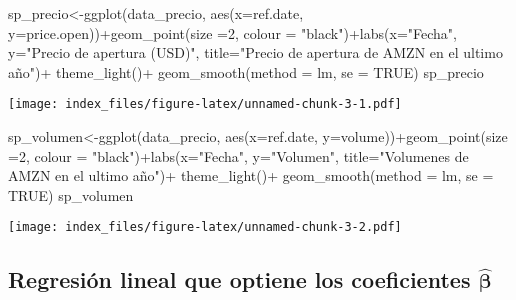 \documentclass[
]{book}
\newenvironment{Shaded}{\begin{snugshade}}{\end{snugshade}}
\newcommand{\AttributeTok}[1]{\textcolor[rgb]{0.77,0.63,0.00}{#1}}
\newcommand{\ConstantTok}[1]{\textcolor[rgb]{0.00,0.00,0.00}{#1}}
\newcommand{\DecValTok}[1]{\textcolor[rgb]{0.00,0.00,0.81}{#1}}
\newcommand{\FunctionTok}[1]{\textcolor[rgb]{0.00,0.00,0.00}{#1}}
\newcommand{\NormalTok}[1]{#1}
\newcommand{\OtherTok}[1]{\textcolor[rgb]{0.56,0.35,0.01}{#1}}
\newcommand{\SpecialCharTok}[1]{\textcolor[rgb]{0.00,0.00,0.00}{#1}}
\newcommand{\StringTok}[1]{\textcolor[rgb]{0.31,0.60,0.02}{#1}}
\begin{document}
\begin{Shaded}
\begin{Highlighting}[]
\NormalTok{sp\_precio}\OtherTok{\textless{}{-}}\FunctionTok{ggplot}\NormalTok{(data\_precio, }\FunctionTok{aes}\NormalTok{(}\AttributeTok{x=}\NormalTok{ref.date, }\AttributeTok{y=}\NormalTok{price.open))}\SpecialCharTok{+}\FunctionTok{geom\_point}\NormalTok{(}\AttributeTok{size =}\DecValTok{2}\NormalTok{, }\AttributeTok{colour =} \StringTok{"black"}\NormalTok{)}\SpecialCharTok{+}\FunctionTok{labs}\NormalTok{(}\AttributeTok{x=}\StringTok{"Fecha"}\NormalTok{, }\AttributeTok{y=}\StringTok{"Precio de apertura (USD)"}\NormalTok{, }\AttributeTok{title=}\StringTok{"Precio de apertura de AMZN en el ultimo año"}\NormalTok{)}\SpecialCharTok{+} \FunctionTok{theme\_light}\NormalTok{()}\SpecialCharTok{+} \FunctionTok{geom\_smooth}\NormalTok{(}\AttributeTok{method =}\NormalTok{ lm, }\AttributeTok{se =} \ConstantTok{TRUE}\NormalTok{)}
\NormalTok{sp\_precio}
\end{Highlighting}
\end{Shaded}

\texttt{[image: index\_files/figure-latex/unnamed-chunk-3-1.pdf]}

\begin{Shaded}
\begin{Highlighting}[]

\NormalTok{sp\_volumen}\OtherTok{\textless{}{-}}\FunctionTok{ggplot}\NormalTok{(data\_precio, }\FunctionTok{aes}\NormalTok{(}\AttributeTok{x=}\NormalTok{ref.date, }\AttributeTok{y=}\NormalTok{volume))}\SpecialCharTok{+}\FunctionTok{geom\_point}\NormalTok{(}\AttributeTok{size =}\DecValTok{2}\NormalTok{, }\AttributeTok{colour =} \StringTok{"black"}\NormalTok{)}\SpecialCharTok{+}\FunctionTok{labs}\NormalTok{(}\AttributeTok{x=}\StringTok{"Fecha"}\NormalTok{, }\AttributeTok{y=}\StringTok{"Volumen"}\NormalTok{, }\AttributeTok{title=}\StringTok{"Volumenes de AMZN en el ultimo año"}\NormalTok{)}\SpecialCharTok{+} \FunctionTok{theme\_light}\NormalTok{()}\SpecialCharTok{+} \FunctionTok{geom\_smooth}\NormalTok{(}\AttributeTok{method =}\NormalTok{ lm, }\AttributeTok{se =} \ConstantTok{TRUE}\NormalTok{)}
\NormalTok{sp\_volumen}
\end{Highlighting}
\end{Shaded}

\texttt{[image: index\_files/figure-latex/unnamed-chunk-3-2.pdf]}

\hypertarget{regresiuxf3n-lineal-que-optiene-los-coeficientes-hatboldsymbol-beta}{%
\subsection{\texorpdfstring{Regresión lineal que optiene los coeficientes \(\hat{\boldsymbol \beta}\)}{Regresión lineal que optiene los coeficientes \textbackslash hat\{\textbackslash boldsymbol \textbackslash beta\}}}\label{regresiuxf3n-lineal-que-optiene-los-coeficientes-hatboldsymbol-beta}}
\end{document}
